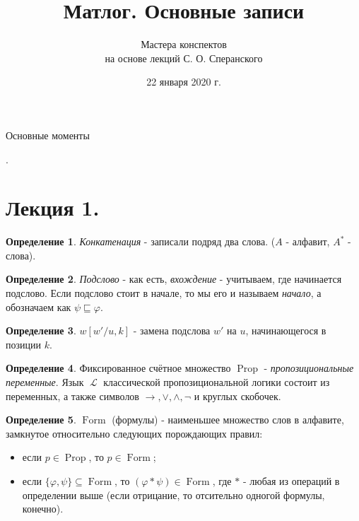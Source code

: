 \documentclass[a4paper,100pt]{article}
\title{Матлог. Основные записи}
\author{Мастера конспектов \\ на основе лекций С. О. Сперанского}
\date{22 января 2020 г.}
\theoremstyle{indented}
\theoremstyle{definition}
\newtheorem{defn}{Определение}
\theoremstyle{remark}
\DeclareMathOperator{\Prop}{Prop}
\DeclareMathOperator{\LL}{\mathscr{L}}
\DeclareMathOperator{\form}{Form}
\begin{document}
\newcommand{\resetexlcounters}{%
  \setcounter{exl}{0}%
} 

\newcommand{\resetremarkcounters}{%
  \setcounter{remark}{0}%
} 

\newcommand{\reseconscounters}{%
  \setcounter{cons}{0}%
} 

\newcommand{\resetall}{%
    \resetexlcounters
    \resetremarkcounters
    \reseconscounters%
}

\maketitle 

\newpage

\hypertarget{t1}{Основные моменты}. 
\tableofcontents

\newpage

\section{Лекция 1.}

\begin{defn}
  \textit{Конкатенация} - записали подряд два слова. ($A$ - алфавит, $A^*$ - слова).
\end{defn}

\begin{defn}
  \textit{Подслово} - как есть, \textit{вхождение} - учитываем, где начинается подслово. Если подслово стоит в начале, то мы его и называем \textit{начало}, а обозначаем как $\psi \sqsubseteq \varphi$.
\end{defn}

\begin{defn}
  $w[w'/u, k]$ - замена подслова $w'$ на $u$, начинающегося в позиции $k$.
\end{defn}

\begin{defn}
  Фиксированное счётное множество $\Prop$ - \textit{пропозициональные переменные}. Язык $\LL$ классической пропозициональной логики состоит из переменных, а также символов $\rightarrow, \vee, \wedge, \neg$ и круглых скобочек.
\end{defn}

\begin{defn}
  $\form$ (формулы) - наименьшее множество слов в алфавите, замкнутое относительно следующих порождающих правил:
  \begin{itemize}
    \item если $p\in \Prop$, то $p\in \form$; 
    \item если $\{\varphi, \psi\}\subseteq \form$, то $(\varphi*\psi)\in \form$, где $*$ - любая из операций в определении выше (если отрицание, то отсительно одногой формулы, конечно).
  \end{itemize}
\end{defn}
\end{document}
